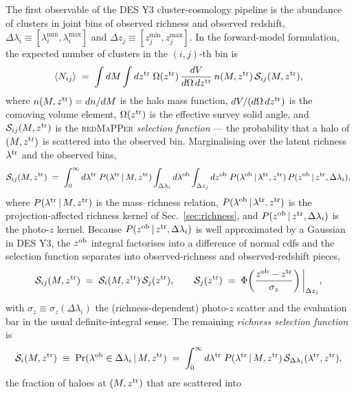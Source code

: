 \documentclass[a4paper, 11pt]{article}
\newcommand{\lob}{\lambda^{\rm ob}}
\newcommand{\ltr}{\lambda^{\rm tr}}
\newcommand{\zob}{z^{\rm ob}}
\newcommand{\ztr}{z^{\rm tr}}
\newcommand{\avg}[1]{\langle #1 \rangle}
\begin{document}
The first observable of the DES Y3 cluster-cosmology pipeline is the
abundance of clusters in joint bins of observed richness and observed
redshift,
$\Delta\lambda_i\equiv[\lambda_i^{\min},\lambda_i^{\max}]$ and
$\Delta z_j\equiv[z_j^{\min},z_j^{\max}]$.  In the forward-model
formulation, the expected number of clusters in the $(i,j)$-th bin is
\begin{equation}
\avg{N_{ij}} \;=\;
\int dM \int d\ztr \;
\Omega(\ztr)\,\frac{dV}{d\Omega\,d\ztr}\,n(M,\ztr)\,
\mathcal{S}_{ij}(M,\ztr) ,
\label{eq:Nij}
\end{equation}
where $n(M,\ztr)=dn/dM$ is the halo mass function,
$dV/(d\Omega\,d\ztr)$ is the comoving volume element,
$\Omega(\ztr)$ is the effective survey solid angle, and
$\mathcal{S}_{ij}(M,\ztr)$ is the
\textsc{redMaPPer} \emph{selection function} --- the probability that
a halo of $(M,\ztr)$ is scattered into the observed bin.  Marginalising
over the latent richness $\ltr$ and the observed bins,
\begin{equation}
\mathcal{S}_{ij}(M,\ztr) \;=\;
\int_0^{\infty} d\ltr \;
P(\ltr\,|\,M,\ztr)
\int_{\Delta\lambda_i} d\lob
\int_{\Delta z_j} d\zob \;
P(\lob\,|\,\ltr,\ztr)\,
P(\zob\,|\,\ztr,\Delta\lambda_i) ,
\label{eq:Sel_full}
\end{equation}
where $P(\ltr\,|\,M,\ztr)$ is the mass--richness relation,
$P(\lob\,|\,\ltr,\ztr)$ is the projection-affected richness kernel of
Sec.~\ref{sec:richness}, and
$P(\zob\,|\,\ztr,\Delta\lambda_i)$ is the photo-$z$ kernel.  Because
$P(\zob\,|\,\ztr,\Delta\lambda_i)$ is well approximated by a Gaussian in
DES Y3, the $\zob$ integral factorises into a difference of normal
cdfs and the selection function separates into observed-richness and
observed-redshift pieces,
\begin{equation}
\mathcal{S}_{ij}(M,\ztr) \;=\;
\mathcal{S}_i(M,\ztr)\,
\mathcal{S}_j(\ztr) ,
\qquad
\mathcal{S}_j(\ztr) \;=\;
\Phi\!\left(\frac{\zob-\ztr}{\sigma_z}\right)\bigg|_{\Delta z_j} ,
\label{eq:Sel_split}
\end{equation}
with $\sigma_z\equiv\sigma_z(\Delta\lambda_i)$ the (richness-dependent)
photo-$z$ scatter and the evaluation bar in the usual
definite-integral sense.  The remaining \emph{richness selection
function} is
\begin{equation}
\mathcal{S}_i(M,\ztr) \;\equiv\;
\Pr(\lob\in\Delta\lambda_i\,|\,M,\ztr) \;=\;
\int_0^{\infty} d\ltr \;
P(\ltr\,|\,M,\ztr)\,
\mathcal{S}_{\Delta\lambda_i}(\ltr,\ztr) ,
\label{eq:Sel_lambda}
\end{equation}
the fraction of haloes at $(M,\ztr)$ that are scattered into
\end{document}
